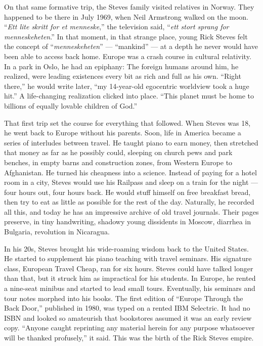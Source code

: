 On that same formative trip, the Steves family visited relatives in
Norway. They happened to be there in July 1969, when Neil Armstrong
walked on the moon. ``\emph{Ett lite skritt for et menneske},'' the
television said, ``\emph{ett stort sprang for menneskeheten}.'' In that
moment, in that strange place, young Rick Steves felt the concept of
``\emph{menneskeheten}'' --- ``mankind'' --- at a depth he never would
have been able to access back home. Europe was a crash course in
cultural relativity. In a park in Oslo, he had an epiphany: The foreign
humans around him, he realized, were leading existences every bit as
rich and full as his own. ``Right there,'' he would write later, ``my
14-year-old egocentric worldview took a huge hit.'' A life-changing
realization clicked into place. ``This planet must be home to billions
of equally lovable children of God.''

That first trip set the course for everything that followed. When Steves
was 18, he went back to Europe without his parents. Soon, life in
America became a series of interludes between travel. He taught piano to
earn money, then stretched that money as far as he possibly could,
sleeping on church pews and park benches, in empty barns and
construction zones, from Western Europe to Afghanistan. He turned his
cheapness into a science. Instead of paying for a hotel room in a city,
Steves would use his Railpass and sleep on a train for the night ---
four hours out, four hours back. He would stuff himself on free
breakfast bread, then try to eat as little as possible for the rest of
the day. Naturally, he recorded all this, and today he has an impressive
archive of old travel journals. Their pages preserve, in tiny
handwriting, shadowy young dissidents in Moscow, diarrhea in Bulgaria,
revolution in Nicaragua.

In his 20s, Steves brought his wide-roaming wisdom back to the United
States. He started to supplement his piano teaching with travel
seminars. His signature class, European Travel Cheap, ran for six hours.
Steves could have talked longer than that, but it struck him as
impractical for his students. In Europe, he rented a nine-seat minibus
and started to lead small tours. Eventually, his seminars and tour notes
morphed into his books. The first edition of ``Europe Through the Back
Door,'' published in 1980, was typed on a rented IBM Selectric. It had
no ISBN and looked so amateurish that bookstores assumed it was an early
review copy. ``Anyone caught reprinting any material herein for any
purpose whatsoever will be thanked profusely,'' it said. This was the
birth of the Rick Steves empire.

